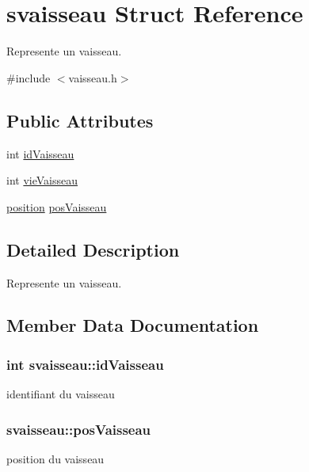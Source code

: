 \hypertarget{structsvaisseau}{}\section{svaisseau Struct Reference}
\label{structsvaisseau}


Represente un vaisseau.  




{\ttfamily \#include $<$vaisseau.\+h$>$}

\subsection*{Public Attributes}
\begin{DoxyCompactItemize}
\item 
int \hyperlink{structsvaisseau_aece78cd56f7eef10075a37316295068b}{id\+Vaisseau}
\item 
int \hyperlink{structsvaisseau_a661f9d4831ee4968817162c5df602946}{vie\+Vaisseau}
\item 
\hyperlink{structsposition}{position} \hyperlink{structsvaisseau_a5ed9869034a1bbee8cb1390a21097a82}{pos\+Vaisseau}
\end{DoxyCompactItemize}


\subsection{Detailed Description}
Represente un vaisseau. 

\subsection{Member Data Documentation}
\subsubsection[{\texorpdfstring{id\+Vaisseau}{idVaisseau}}]{\setlength{\rightskip}{0pt plus 5cm}int svaisseau\+::id\+Vaisseau}\hypertarget{structsvaisseau_aece78cd56f7eef10075a37316295068b}{}\label{structsvaisseau_aece78cd56f7eef10075a37316295068b}
identifiant du vaisseau 
\subsubsection[{\texorpdfstring{pos\+Vaisseau}{posVaisseau}}]{ svaisseau\+::pos\+Vaisseau}\hypertarget{structsvaisseau_a5ed9869034a1bbee8cb1390a21097a82}{}\label{structsvaisseau_a5ed9869034a1bbee8cb1390a21097a82}
position du vaisseau 
